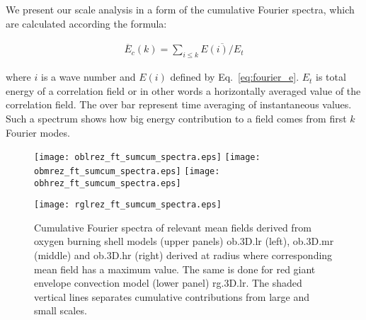 \documentclass[10pt,paper=a4]{report}
\newcommand{\eht}{\overline}
\newcommand{\fht}{\widetilde}
\begin{document}


We present our scale analysis in a form of the cumulative Fourier spectra, which are calculated according the formula:

\begin{align}
\eht{E}_c(k) = \sum_{i \le k} \eht{E(i)/E_t}
\end{align}

where $i$ is a wave number and $E(i)$ defined by Eq.~\ref{eq:fourier_e}. $E_t$ is total energy of a correlation field or in other words a horizontally averaged value of the correlation field. The over bar represent time averaging of instantaneous values. Such a spectrum shows how big energy contribution to a field comes from first $k$ Fourier modes.

\begin{figure}[!h]
\centerline{
\texttt{[image: oblrez\_ft\_sumcum\_spectra.eps]}
\texttt{[image: obmrez\_ft\_sumcum\_spectra.eps]}
\texttt{[image: obhrez\_ft\_sumcum\_spectra.eps]}} 

\centerline{
\texttt{[image: rglrez\_ft\_sumcum\_spectra.eps]}}
\caption{Cumulative Fourier spectra of relevant mean fields derived from oxygen burning shell models (upper panels) {\sf ob.3D.lr} (left), {\sf ob.3D.mr} (middle) and {\sf ob.3D.hr} (right) derived at radius where corresponding mean field has a maximum value. The same is done for red giant envelope convection model (lower panel) {\sf rg.3D.lr}. The shaded vertical lines separates cumulative contributions from large and small scales.}
\end{figure}



\end{document}
